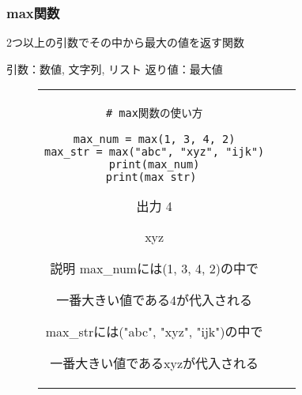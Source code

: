 \documentclass{jsarticle}
\begin{document}
\subsubsection{max関数}
2つ以上の引数でその中から最大の値を返す関数 \par
引数：数値, 文字列, リスト \hspace{5mm}
返り値：最大値
\vspace{-5mm}
\begin{figure}[h]
	\begin{tabular}{ccc}
		\begin{minipage}[t]{.4\textwidth}
			\begin{lstlisting}[caption=max関数]
# max関数の使い方

max_num = max(1, 3, 4, 2)
max_str = max("abc", "xyz", "ijk")
print(max_num)
print(max_str) \end{lstlisting}
		\end{minipage} \hspace{5mm}
		\begin{minipage}[t]{.1\textwidth}
			\begin{itembox}[l]{出力}
				4 \par
				xyz \par
			\end{itembox}
		\end{minipage} \hspace{5mm}
		\begin{minipage}[t]{.45\textwidth}
			\begin{itembox}[l]{説明}
				max\_numには(1, 3, 4, 2)の中で\par 一番大きい値である4が代入される \par
				max\_strには("abc", "xyz", "ijk")の中で \par 一番大きい値であるxyzが代入される
			\end{itembox}
		\end{minipage}
	\end{tabular}
\end{figure}
\newpage
\end{document}
